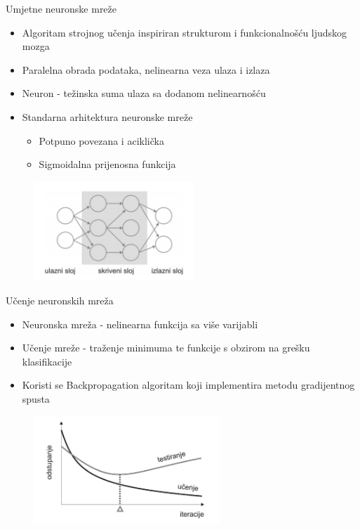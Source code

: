 \documentclass[pdf]{beamer}
\begin{document}
\begin{frame}{Umjetne neuronske mreže}

\begin{itemize}
\setlength\itemsep{0.5em}
	\item Algoritam strojnog učenja inspiriran strukturom i funkcionalnošću ljudskog mozga

 	\item  Paralelna obrada podataka, nelinearna veza ulaza i izlaza
	\item Neuron - težinska suma ulaza sa dodanom nelinearnošću
	 \item Standarna arhitektura neuronske mreže
 	\begin{itemize}
 		\item Potpuno povezana i aciklička
 		\item Sigmoidalna prijenosna funkcija
 	\end{itemize}
 
\end{itemize}

\begin{figure}
\centering
\includegraphics[width=6cm]{slike/neural_architecture.png}
\end{figure}

\end{frame}

\begin{frame}{Učenje neuronskih mreža}

\begin{itemize}
\setlength\itemsep{0.5em}

	\item Neuronska mreža - nelinearna funkcija sa više varijabli

 	\item Učenje mreže - traženje minimuma te funkcije s obzirom na grešku klasifikacije

	\item Koristi se Backpropagation algoritam koji implementira metodu gradijentnog spusta 
	
\end{itemize}

\begin{figure}
\centering
\includegraphics[width=7cm]{slike/generalization.png}
\end{figure}
 		
\end{frame}
\end{document}
